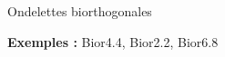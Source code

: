 \begin{frame}{Ondelettes biorthogonales}


    \textbf{Exemples :} Bior4.4, Bior2.2, Bior6.8

\end{frame}


